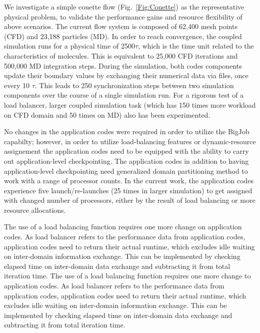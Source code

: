 \documentclass[conference,final]{IEEEtran}
\newcommand{\jhanote}[1]{ {\textcolor{red} { ***Jha: #1 }}}
\newcommand{\jhanote}[1]{}
\begin{document}
We investigate a simple couette flow (Fig.~\ref{Fig:Couette}) as the
representative physical problem, to validate the performance gains and
resource flexibility of above scenarios.  The current flow system is
composed of 62,400 mesh points (CFD) and 23,188 particles (MD).  In
order to reach convergence, the coupled simulation runs for a physical
time of 2500$\tau$, which is the time unit related to the
characteristics of molecules. This is equivalent to 25,000 CFD
iterations and 500,000 MD integration steps. During the simulation,
both codes components update their boundary values by exchanging their
numerical data via files, once every 10 $\tau$. This leads to 250
synchronization steps between two simulation components over the
course of a single simulation run. For a rigorous test of a load
balancer, larger coupled simulation task (which has 150 times more
workload on CFD domain and 50 times on MD) also has been experimented.

No changes in the application codes were required in order to utilize
the BigJob capabilty; however, in order to utilize load-balancing
features or dynamic-resource assignement the application codes need to
be equipped with the ability to carry out application-level
checkpointing.  The application codes in addition to having
application-level checkpointing need generalized domain partitioning
method to work with a range of processor counts. In the current work,
the application codes experience five launch/re-launches (25 times in
larger simulation) to get assigned with changed number of processors,
either by the result of load balancing or more resource allocations.


The use of a load balancing function requires one more change on
application codes. As load balancer refers to the performance data
from application codes, application codes need to return their actual
runtime, which excludes idle waiting on inter-domain information
exchange. This can be implemented by checking elapsed time on
inter-domain data exchange and subtracting it from total iteration
time.  The use of a load balancing function requires one more change
to application codes. As load balancer refers to the performance data
from application codes, application codes need to return their actual
runtime, which excludes idle waiting on inter-domain information
exchange. This can be implemented by checking elapsed time on
inter-domain data exchange and subtracting it from total iteration
time.

\end{document}
